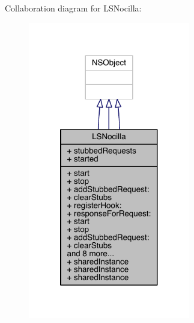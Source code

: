 Collaboration diagram for L\-S\-Nocilla\-:\nopagebreak
\begin{figure}[H]
\begin{center}
\leavevmode
\includegraphics[width=200pt]{interface_l_s_nocilla__coll__graph}
\end{center}
\end{figure}
